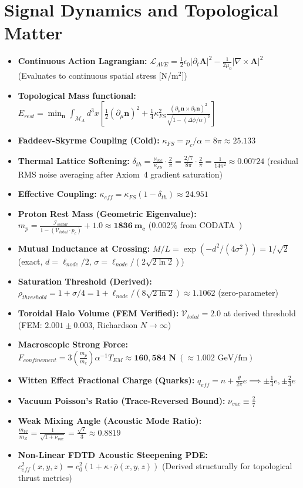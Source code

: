 \section{Signal Dynamics and Topological Matter}
\begin{itemize}
    \item \textbf{Continuous Action Lagrangian:} $\mathcal{L}_{AVE} = \frac{1}{2}\epsilon_0 |\partial_t \mathbf{A}|^2 - \frac{1}{2\mu_0} |\nabla \times \mathbf{A}|^2$ (Evaluates to continuous spatial stress [N/m$^2$])
    \item \textbf{Topological Mass functional:} $E_{rest} = \min_{\mathbf{n}} \int_{\mathcal{M}_A} d^3x \left[ \frac{1}{2} (\partial_\mu \mathbf{n})^2 + \frac{1}{4} \kappa_{FS}^2 \frac{(\partial_\mu \mathbf{n} \times \partial_\nu \mathbf{n})^2}{\sqrt{1 - (\Delta\phi / \alpha)^2}} \right]$
    \item \textbf{Faddeev-Skyrme Coupling (Cold):} $\kappa_{FS} = p_c / \alpha = 8\pi \approx 25.133$
    \item \textbf{Thermal Lattice Softening:} $\delta_{th} = \frac{\nu_{vac}}{\kappa_{FS}} \cdot \frac{2}{\pi} = \frac{2/7}{8\pi} \cdot \frac{2}{\pi} = \frac{1}{14\pi^2} \approx 0.00724$ (residual RMS noise averaging after Axiom~4 gradient saturation)
    \item \textbf{Effective Coupling:} $\kappa_{eff} = \kappa_{FS}(1-\delta_{th}) \approx 24.951$
    \item \textbf{Proton Rest Mass (Geometric Eigenvalue):} $m_p = \frac{\mathcal{I}_{scalar}}{1 - (\mathcal{V}_{total} \cdot p_c)} + 1.0 \approx \mathbf{1836\ m_e}$ (0.002\% from CODATA~\cite{codata2018})
    \item \textbf{Mutual Inductance at Crossing:} $M/L = \exp(-d^2/(4\sigma^2)) = 1/\sqrt{2}$ (exact, $d = \ell_{node}/2$, $\sigma = \ell_{node}/(2\sqrt{2\ln2})$)
    \item \textbf{Saturation Threshold (Derived):} $\rho_{threshold} = 1 + \sigma/4 = 1 + \ell_{node}/(8\sqrt{2\ln 2}) \approx 1.1062$ (zero-parameter)
    \item \textbf{Toroidal Halo Volume (FEM Verified):} $\mathcal{V}_{total} = 2.0$ at derived threshold (FEM: $2.001 \pm 0.003$, Richardson $N\to\infty$)
    \item \textbf{Macroscopic Strong Force:} $F_{confinement} = 3 \left(\frac{m_p}{m_e}\right) \alpha^{-1} T_{EM} \approx \mathbf{160{,}584\text{ N}} \ (\approx 1.002\text{ GeV/fm})$
    \item \textbf{Witten Effect Fractional Charge (Quarks):} $q_{eff} = n + \frac{\theta}{2\pi}e \implies \pm \frac{1}{3}e, \pm \frac{2}{3}e$
    \item \textbf{Vacuum Poisson's Ratio (Trace-Reversed Bound):} $\nu_{vac} \equiv \frac{2}{7}$
    \item \textbf{Weak Mixing Angle (Acoustic Mode Ratio):} $\frac{m_W}{m_Z} = \frac{1}{\sqrt{1+\nu_{vac}}} = \frac{\sqrt{7}}{3} \approx \mathbf{0.8819}$
    \item \textbf{Non-Linear FDTD Acoustic Steepening PDE:} $c_{eff}^2(x, y, z) = c_0^2 \left(1 + \kappa \cdot \bar{\rho}(x, y, z) \right)$ (Derived structurally for topological thrust metrics)
\end{itemize}

